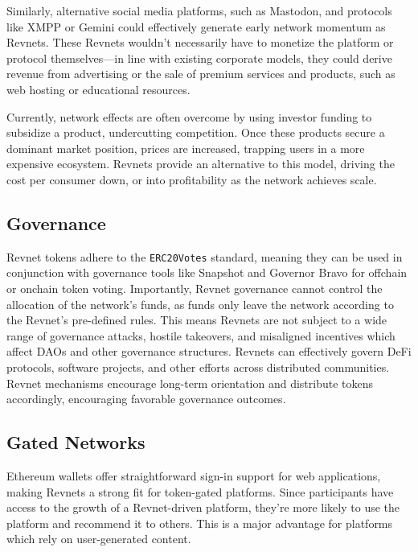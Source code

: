 \documentclass{article}
\begin{document}
Similarly, alternative social media platforms, such as Mastodon, and protocols like XMPP or Gemini could effectively generate early network momentum as Revnets. These Revnets wouldn't necessarily have to monetize the platform or protocol themselves---in line with existing corporate models, they could derive revenue from advertising or the sale of premium services and products, such as web hosting or educational resources. 

Currently, network effects are often overcome by using investor funding to subsidize a product, undercutting competition. Once these products secure a dominant market position, prices are increased, trapping users in a more expensive ecosystem. Revnets provide an alternative to this model, driving the cost per consumer down, or into profitability as the network achieves scale.

\subsection{Governance}

Revnet tokens adhere to the \texttt{ERC20Votes} standard, meaning they can be used in conjunction with governance tools like Snapshot and Governor Bravo for offchain or onchain token voting. Importantly, Revnet governance cannot control the allocation of the network's funds, as funds only leave the network according to the Revnet's pre-defined rules. This means Revnets are not subject to a wide range of governance attacks, hostile takeovers, and misaligned incentives which affect DAOs and other governance structures. Revnets can effectively govern DeFi protocols, software projects, and other efforts across distributed communities. Revnet mechanisms encourage long-term orientation and distribute tokens accordingly, encouraging favorable governance outcomes.

\subsection{Gated Networks}

Ethereum wallets offer straightforward sign-in support for web applications, making Revnets a strong fit for token-gated platforms. Since participants have access to the growth of a Revnet-driven platform, they're more likely to use the platform and recommend it to others. This is a major advantage for platforms which rely on user-generated content.
\end{document}
